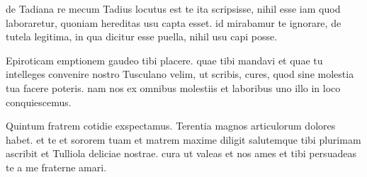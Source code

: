  de Tadiana re mecum Tadius locutus est te ita scripsisse, nihil esse iam quod laboraretur, quoniam hereditas usu capta esset. id mirabamur te ignorare, de tutela legitima, in qua dicitur esse puella, nihil usu capi posse.

 Epiroticam emptionem gaudeo tibi placere. quae tibi mandavi et quae tu intelleges convenire nostro Tusculano velim, ut scribis, cures, quod sine molestia tua facere poteris. nam nos ex omnibus molestiis et laboribus uno illo in loco conquiescemus.

 Quintum fratrem cotidie exspectamus. Terentia magnos articulorum dolores habet. et te et sororem tuam et matrem maxime diligit salutemque tibi plurimam ascribit et Tulliola deliciae nostrae. cura ut valeas et nos ames et tibi persuadeas te a me fraterne amari.
